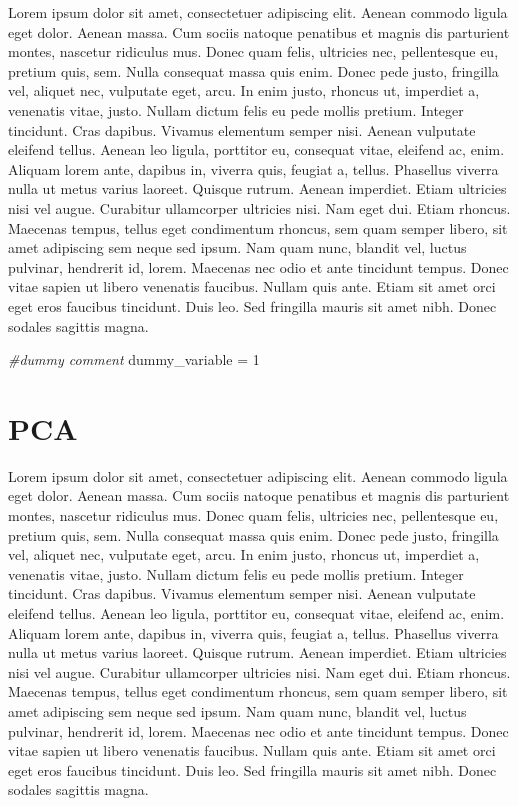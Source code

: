 \documentclass[]{book}
\newenvironment{Shaded}{\begin{snugshade}}{\end{snugshade}}
\newcommand{\DecValTok}[1]{\textcolor[rgb]{0.00,0.00,0.81}{#1}}
\newcommand{\StringTok}[1]{\textcolor[rgb]{0.31,0.60,0.02}{#1}}
\newcommand{\CommentTok}[1]{\textcolor[rgb]{0.56,0.35,0.01}{\textit{#1}}}
\newcommand{\NormalTok}[1]{#1}
\begin{document}
Lorem ipsum dolor sit amet, consectetuer adipiscing elit. Aenean commodo
ligula eget dolor. Aenean massa. Cum sociis natoque penatibus et magnis
dis parturient montes, nascetur ridiculus mus. Donec quam felis,
ultricies nec, pellentesque eu, pretium quis, sem. Nulla consequat massa
quis enim. Donec pede justo, fringilla vel, aliquet nec, vulputate eget,
arcu. In enim justo, rhoncus ut, imperdiet a, venenatis vitae, justo.
Nullam dictum felis eu pede mollis pretium. Integer tincidunt. Cras
dapibus. Vivamus elementum semper nisi. Aenean vulputate eleifend
tellus. Aenean leo ligula, porttitor eu, consequat vitae, eleifend ac,
enim. Aliquam lorem ante, dapibus in, viverra quis, feugiat a, tellus.
Phasellus viverra nulla ut metus varius laoreet. Quisque rutrum. Aenean
imperdiet. Etiam ultricies nisi vel augue. Curabitur ullamcorper
ultricies nisi. Nam eget dui. Etiam rhoncus. Maecenas tempus, tellus
eget condimentum rhoncus, sem quam semper libero, sit amet adipiscing
sem neque sed ipsum. Nam quam nunc, blandit vel, luctus pulvinar,
hendrerit id, lorem. Maecenas nec odio et ante tincidunt tempus. Donec
vitae sapien ut libero venenatis faucibus. Nullam quis ante. Etiam sit
amet orci eget eros faucibus tincidunt. Duis leo. Sed fringilla mauris
sit amet nibh. Donec sodales sagittis magna.

\begin{Shaded}
\begin{Highlighting}[]
\CommentTok{#dummy comment}
\NormalTok{dummy_variable =}\StringTok{ }\DecValTok{1}
\end{Highlighting}
\end{Shaded}

\section{PCA}\label{pca}

Lorem ipsum dolor sit amet, consectetuer adipiscing elit. Aenean commodo
ligula eget dolor. Aenean massa. Cum sociis natoque penatibus et magnis
dis parturient montes, nascetur ridiculus mus. Donec quam felis,
ultricies nec, pellentesque eu, pretium quis, sem. Nulla consequat massa
quis enim. Donec pede justo, fringilla vel, aliquet nec, vulputate eget,
arcu. In enim justo, rhoncus ut, imperdiet a, venenatis vitae, justo.
Nullam dictum felis eu pede mollis pretium. Integer tincidunt. Cras
dapibus. Vivamus elementum semper nisi. Aenean vulputate eleifend
tellus. Aenean leo ligula, porttitor eu, consequat vitae, eleifend ac,
enim. Aliquam lorem ante, dapibus in, viverra quis, feugiat a, tellus.
Phasellus viverra nulla ut metus varius laoreet. Quisque rutrum. Aenean
imperdiet. Etiam ultricies nisi vel augue. Curabitur ullamcorper
ultricies nisi. Nam eget dui. Etiam rhoncus. Maecenas tempus, tellus
eget condimentum rhoncus, sem quam semper libero, sit amet adipiscing
sem neque sed ipsum. Nam quam nunc, blandit vel, luctus pulvinar,
hendrerit id, lorem. Maecenas nec odio et ante tincidunt tempus. Donec
vitae sapien ut libero venenatis faucibus. Nullam quis ante. Etiam sit
amet orci eget eros faucibus tincidunt. Duis leo. Sed fringilla mauris
sit amet nibh. Donec sodales sagittis magna.
\end{document}
